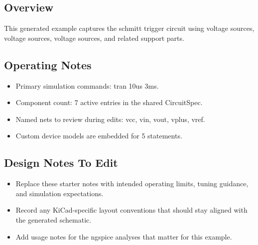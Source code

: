\subsection*{Overview}
This generated example captures the schmitt trigger circuit using voltage sources, voltage sources, voltage sources, and related support parts.

\subsection*{Operating Notes}
\begin{itemize}
  \item Primary simulation commands: tran 10us 3ms.
  \item Component count: 7 active entries in the shared CircuitSpec.
  \item Named nets to review during edits: vcc, vin, vout, vplus, vref.
  \item Custom device models are embedded for 5 statements.
\end{itemize}
\subsection*{Design Notes To Edit}
\begin{itemize}
  \item Replace these starter notes with intended operating limits, tuning guidance, and simulation expectations.
  \item Record any KiCad-specific layout conventions that should stay aligned with the generated schematic.
  \item Add usage notes for the ngspice analyses that matter for this example.
\end{itemize}
